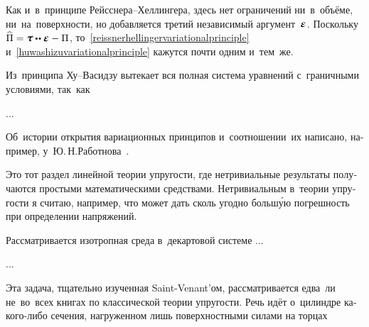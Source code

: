 \begin{otherlanguage}{russian}
Как и~в~принципе Рейсснера\hbox{--}Хеллингера, здесь нет ограничений ни~в~объёме, ни~на~поверхности, но добавляется третий независимый аргумент~$\mathboldepsilon$. Поскольку ${\widehat{\Pi} = \mathboldtau \dotdotp \mathboldepsilon - \Pi}$, то~\eqref{reissnerhellingervariationalprinciple} и~\eqref{huwashizuvariationalprinciple} кажутся почти одним и~тем~же.

Из~принципа Ху\hbox{--}Васидзу вытекает вся полная система уравнений с~граничными условиями, так~как

...


Об~истории открытия вариационных принципов и~соотношении~их написано, например, у~Ю.\,Н.\;Работнова~\cite{rabotnov-mechanicsofdeformable}.



Это тот раздел линейной теории упругости, где нетривиальные результаты получаются простыми математическими средствами. Нетривиальным в~теории упругости я считаю, например, что  может дать сколь угодно больш\'{у}ю погрешность при определении напряжений.

Рассматривается изотропная среда в~декартовой системе ...

...





\label{para:twistingofrods.saintvenant}

Эта задача, тщательно изученная Saint\hbox{-\hspace{-0.2ex}}Venant’ом, рассматривается едва~ли не~во~всех книгах по классической теории упругости. Речь идёт о~цилиндре какого\hbox{-}либо сечения, нагруженном лишь поверхностными силами на торцах


\end{otherlanguage}
